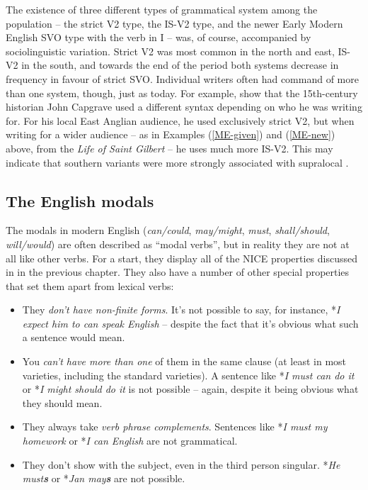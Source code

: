 \noindent The existence of three different types of grammatical system among the population -- the strict V2 type, the IS-V2 type, and the newer Early Modern English SVO type with the verb in I -- was, of course, accompanied by sociolinguistic variation. Strict V2 was most common in the north and east, IS-V2 in the south, and towards the end of the period both systems decrease in frequency in favour of strict SVO. Individual writers often had command of more than one system, though, just as today. For example, \citet{EitlerWestergaard2014} show that the 15th-century historian John Capgrave used a different syntax depending on who he was writing for. For his local East Anglian audience, he used exclusively strict V2, but when writing for a wider audience -- as in Examples (\ref{ME-given}) and (\ref{ME-new}) above, from the \emph{Life of Saint Gilbert} -- he uses much more IS-V2. This may indicate that southern variants were more strongly associated with supralocal .

\subsection{The English modals}\label{ME-modals}

The modals in modern English (\emph{can/could}, \emph{may/might}, \emph{must}, \emph{shall/should}, \emph{will/would}) are often described as ``modal verbs'', but in reality they are not at all like other verbs. For a start, they display all of the NICE properties discussed in  in the previous chapter. They also have a number of other special properties that set them apart from lexical verbs:

\begin{itemize}
    \item They \emph{don't have non-finite forms}. It's not possible to say, for instance, *\emph{I expect him to can speak English} -- despite the fact that it's obvious what such a sentence would mean.
    \item You \emph{can't have more than one} of them in the same clause (at least in most varieties, including the standard varieties). A sentence like *\emph{I must can do it} or *\emph{I might should do it} is not possible -- again, despite it being obvious what they should mean.
    \item They always take \emph{verb phrase complements}. Sentences like *\emph{I must my homework} or *\emph{I can English} are not grammatical.
    \item They don't show  with the subject, even in the third person singular. *\emph{He must\textbf{s}} or *\emph{Jan may\textbf{s}} are not possible.
\end{itemize}


